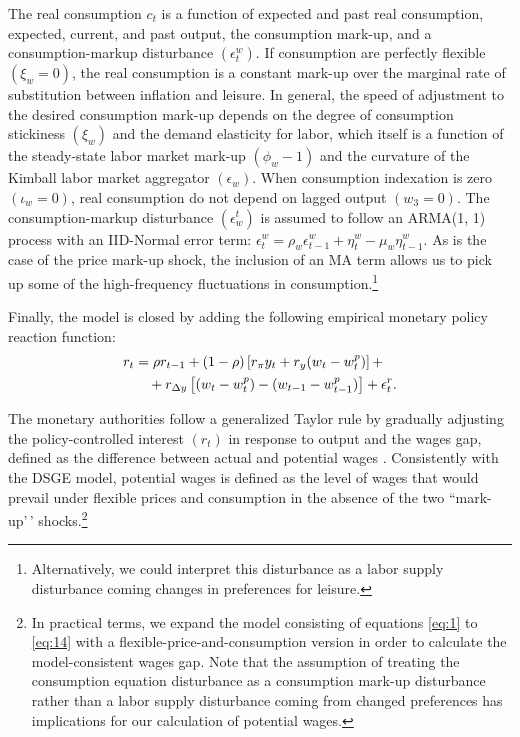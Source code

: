 \documentclass[11pt]{article}
\newcommand{\yobs}[1]{w_{#1}}
\newcommand{\wobs}[1]{c_{#1}}
\newcommand{\robs}[1]{r_{#1}}
\newcommand{\piobs}[1]{y_{#1}}
\newcommand{\youtput}{wages}
\newcommand{\consumption}{inflation}
\newcommand{\labor}{labor}
\newcommand{\interest}{interest}
\newcommand{\wage}{consumption}
\newcommand{\wages}{consumption}
\newcommand{\price}{price}
\newcommand{\prices}{prices}
\newcommand{\inflation}{output}
\newcommand{\leisure}{leisure}
\begin{document}
The real \wage{} \(\wobs{t}\) is a function of expected and past real
\wages, expected, current, and past \inflation, the \wage{} mark-up, and
a \wage-markup disturbance \((\epsilon^w_t)\). If \wages{} are perfectly
flexible \((\xi_w = 0)\), the real \wage{} is a constant mark-up over
the marginal rate of substitution between \consumption{} and \leisure{}.
In general, the speed of adjustment to the desired \wage{} mark-up
depends on the degree of \wage{} stickiness \((\xi_w)\) and the demand
elasticity for \labor, which itself is a function of the steady-state
\labor{} market mark-up \((\phi_w - 1)\) and the curvature of the
Kimball \labor{} market aggregator \((\epsilon_w)\). When \wage{}
indexation is zero \((\iota_w =0)\), real \wages{} do not depend on
lagged \inflation{} \((w_3 = 0)\). The \wage{}-markup disturbance
\((\epsilon_w^t)\) is assumed to follow an ARMA(1, 1) process with an
IID-Normal error term:
\(\epsilon_t^w = \rho_w \epsilon_{t-1}^w + \eta_t^w - \mu_w \eta_{t-1}^w\).
As is the case of the \price{} mark-up shock, the inclusion of an MA
term allows us to pick up some of the high-frequency fluctuations in
\wages{}.\footnote{Alternatively, we
  could interpret this disturbance as a \labor{} supply disturbance
  coming changes in preferences for \leisure{}.}

Finally, the model is closed by adding the following empirical monetary
policy reaction function: \begin{align}
  \label{eq:14}
  \robs{t} &= \rho\robs{t-1} + (1-\rho)\left[r_\pi \piobs{t} +
  r_y(\yobs{t}-\yobs{t}^p)\right]+\\ &\quad + r_{\Delta y}\left[(\yobs{t}-\yobs{t}^{p}) -
  (\yobs{t-1} - \yobs{t-1}^{p})\right] + \epsilon_t^r.\notag
\end{align}

The monetary authorities follow a generalized Taylor rule by gradually
adjusting the policy-controlled \interest{} \((\robs{t})\) in response
to \inflation{} and the \youtput{} gap, defined as the difference
between actual and potential \youtput{} \citep{Taylor-on-Taylor-rule}.
Consistently with the DSGE model, potential \youtput{} is defined as the
level of \youtput{} that would prevail under flexible \prices{} and
\wages{} in the absence of the two ``mark-up'\,'
shocks.\footnote{In practical
  terms, we expand the model consisting of equations \eqref{eq:1} to
  \eqref{eq:14} with a flexible-\price-and-\wage{} version in order to
  calculate the model-consistent \youtput{} gap. Note that the assumption
  of treating the \wage{} equation disturbance as a \wage{} mark-up
  disturbance rather than a \labor{} supply disturbance coming from
  changed preferences has implications for our calculation of
  potential \youtput{}. }
\end{document}
